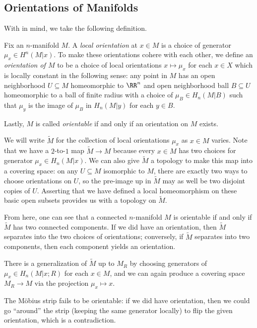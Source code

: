 \documentclass[../notes.tex]{subfiles}
\begin{document}
\subsection{Orientations of Manifolds}
With  in mind, we take the following definition.
\begin{definition}[orientation]
	Fix an $n$-manifold $M$. A \textit{local orientation} at $x\in M$ is a choice of generator $\mu_x\in H^n(M|x)$. To make these orientations cohere with each other, we define an \textit{orientation of $M$} to be a choice of local orientations $x\mapsto\mu_x$ for each $x\in X$ which is locally constant in the following sense: any point in $M$ has an open neighborhood $U\subseteq M$ homeomorphic to $\RR^n$ and open neighborhood ball $B\subseteq U$ homeomorphic to a ball of finite radius with a choice of $\mu_B\in H_n(M|B)$ such that $\mu_y$ is the image of $\mu_B$ in $H_n(M|y)$ for each $y\in B$.

	Lastly, $M$ is called \textit{orientable} if and only if an orientation on $M$ exists.
\end{definition}
We will write $\widetilde M$ for the collection of local orientations $\mu_x$ as $x\in M$ varies. Note that we have a $2$-to-$1$ map $\widetilde M\to M$ because every $x\in M$ has two choices for generator $\mu_x\in H_n(M|x)$. We can also give $\widetilde M$ a topology to make this map into a covering space: on any $U\subseteq M$ isomorphic to $M$, there are exactly two ways to choose orientations on $U$, so the pre-image up in $\widetilde M$ may as well be two disjoint copies of $U$. Asserting that we have defined a local homeomorphism on these basic open subsets provides us with a topology on $\widetilde M$.
\begin{remark}
	From here, one can see that a connected $n$-manifold $M$ is orientable if and only if $\widetilde M$ has two connected components. If we did have an orientation, then $\widetilde M$ separates into the two choices of orientations; conversely, if $\widetilde M$ separates into two components, then each component yields an orientation.
\end{remark}
\begin{remark}
	There is a generalization of $\widetilde M$ up to $M_R$ by choosing generators of $\mu_x\in H_n(M|x;R)$ for each $x\in M$, and we can again produce a covering space $M_R\to M$ via the projection $\mu_x\mapsto x$.
\end{remark}
\begin{example}
	The M\"obius strip fails to be orientable: if we did have orientation, then we could go ``around'' the strip (keeping the same generator locally) to flip the given orientation, which is a contradiction.
\end{example}
\end{document}
